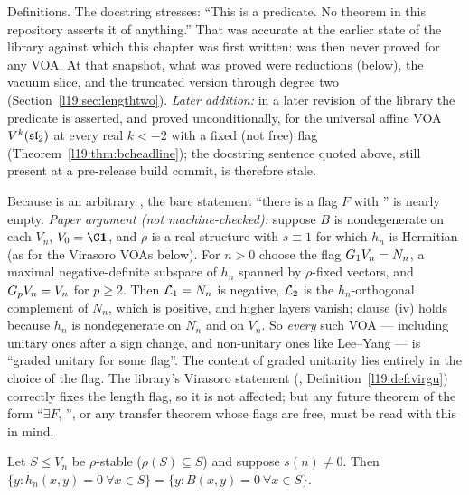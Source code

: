\begin{status}
Definitions. The docstring stresses: ``This is a predicate. No theorem in this repository asserts
it of anything.'' That was accurate at the earlier state of the library against which this chapter was first written:
 was then never proved for any VOA. At that snapshot, what was proved were reductions (below), the vacuum slice, and the truncated
version through degree two (Section~\ref{l19:sec:lengthtwo}). \emph{Later addition:} in a later revision of the library
the predicate is asserted, and proved unconditionally, for the universal affine VOA $V^k(\mathfrak{sl}_2)$ at every real
$k<-2$ with a fixed (not free) flag (Theorem~\ref{l19:thm:bcheadline}); the docstring sentence quoted above, still
present at a pre-release build commit, is therefore stale.
\end{status}

\begin{warning}[title={The abstract predicate is only as meaningful as the flag supplied}]\label{l19:warn:freeflag}
Because  is an arbitrary , the bare statement ``there is a flag $F$ with
'' is nearly empty. \emph{Paper argument (not machine-checked):} suppose $B$
is nondegenerate on each $V_n$, $V_0 = \C\lnineteenvac$, and $\rho$ is a real structure with $s\equiv1$
for which $h_n$ is Hermitian (as for the Virasoro VOAs below). For $n>0$ choose the flag
$G_1V_n = N_n$, a maximal negative-definite subspace of $h_n$ spanned by $\rho$-fixed vectors,
and $G_pV_n = V_n$ for $p\ge2$. Then $\mathcal{L}_1 = N_n$ is negative, $\mathcal{L}_2$ is
the $h_n$-orthogonal complement of $N_n$, which is positive, and higher layers vanish; clause (iv)
holds because $h_n$ is nondegenerate on $N_n$ and on $V_n$. So \emph{every} such VOA --- including
unitary ones after a sign change, and non-unitary ones like Lee--Yang --- is ``graded unitary for some
flag''. The content of graded unitarity lies entirely in the choice of the flag. The library's
Virasoro statement (, Definition~\ref{l19:def:virgu}) correctly fixes the
length flag, so it is not affected; but any future theorem of the form
``$\exists F$, '', or any transfer theorem whose flags are free, must be read with
this in mind.
\end{warning}

\begin{theorem}\label{l19:thm:orthsame}
Let $S\le V_n$ be $\rho$-stable ($\rho(S)\subseteq S$) and suppose $s(n)\ne0$. Then
$\{y : h_n(x,y) = 0\ \forall x\in S\} = \{y : B(x,y) = 0\ \forall x\in S\}$.
\end{theorem}

